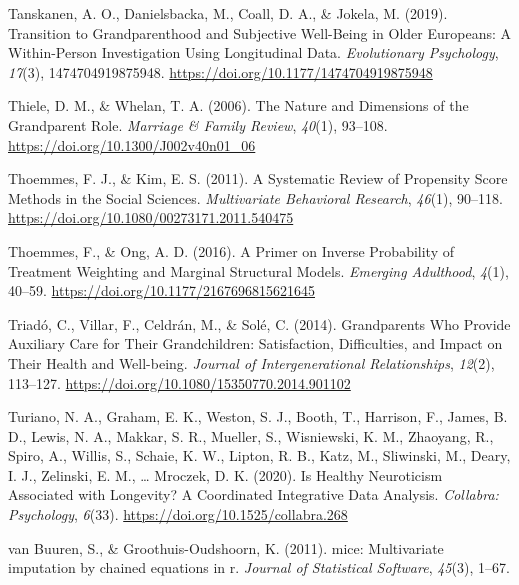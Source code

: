 \documentclass[
  english,
  man, noextraspace]{apa7}
\begin{document}
\leavevmode\hypertarget{ref-tanskanenTransitionGrandparenthoodSubjective2019}{}%
Tanskanen, A. O., Danielsbacka, M., Coall, D. A., \& Jokela, M. (2019). Transition to Grandparenthood and Subjective Well-Being in Older Europeans: A Within-Person Investigation Using Longitudinal Data. \emph{Evolutionary Psychology}, \emph{17}(3), 1474704919875948. \url{https://doi.org/10.1177/1474704919875948}

\leavevmode\hypertarget{ref-thieleNatureDimensionsGrandparent2006a}{}%
Thiele, D. M., \& Whelan, T. A. (2006). The Nature and Dimensions of the Grandparent Role. \emph{Marriage \& Family Review}, \emph{40}(1), 93--108. \url{https://doi.org/10.1300/J002v40n01_06}

\leavevmode\hypertarget{ref-thoemmesSystematicReviewPropensity2011}{}%
Thoemmes, F. J., \& Kim, E. S. (2011). A Systematic Review of Propensity Score Methods in the Social Sciences. \emph{Multivariate Behavioral Research}, \emph{46}(1), 90--118. \url{https://doi.org/10.1080/00273171.2011.540475}

\leavevmode\hypertarget{ref-thoemmesPrimerInverseProbability2016}{}%
Thoemmes, F., \& Ong, A. D. (2016). A Primer on Inverse Probability of Treatment Weighting and Marginal Structural Models. \emph{Emerging Adulthood}, \emph{4}(1), 40--59. \url{https://doi.org/10.1177/2167696815621645}

\leavevmode\hypertarget{ref-triadoGrandparentsWhoProvide2014}{}%
Triadó, C., Villar, F., Celdrán, M., \& Solé, C. (2014). Grandparents Who Provide Auxiliary Care for Their Grandchildren: Satisfaction, Difficulties, and Impact on Their Health and Well-being. \emph{Journal of Intergenerational Relationships}, \emph{12}(2), 113--127. \url{https://doi.org/10.1080/15350770.2014.901102}

\leavevmode\hypertarget{ref-turianoHealthyNeuroticismAssociated2020}{}%
Turiano, N. A., Graham, E. K., Weston, S. J., Booth, T., Harrison, F., James, B. D., Lewis, N. A., Makkar, S. R., Mueller, S., Wisniewski, K. M., Zhaoyang, R., Spiro, A., Willis, S., Schaie, K. W., Lipton, R. B., Katz, M., Sliwinski, M., Deary, I. J., Zelinski, E. M., \ldots{} Mroczek, D. K. (2020). Is Healthy Neuroticism Associated with Longevity? A Coordinated Integrative Data Analysis. \emph{Collabra: Psychology}, \emph{6}(33). \url{https://doi.org/10.1525/collabra.268}

\leavevmode\hypertarget{ref-mice2011}{}%
van Buuren, S., \& Groothuis-Oudshoorn, K. (2011). mice: Multivariate imputation by chained equations in r. \emph{Journal of Statistical Software}, \emph{45}(3), 1--67.
\end{document}
